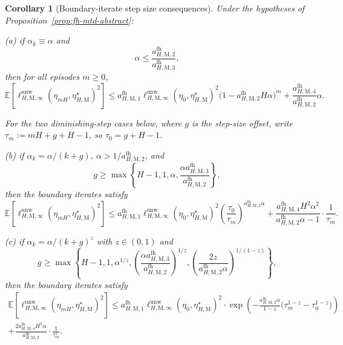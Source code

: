 \documentclass{article}
\newtheorem{corollary}[theorem]{Corollary}
\begin{document}
\begin{corollary}[Boundary-iterate step size consequences]
\label{cor:fh-mtd-steps}
Under the hypotheses of Proposition~\ref{prop:fh-mtd-abstract}:

\textup{(a)} if $\alpha_k \equiv \alpha$ and
\begin{equation}
\alpha \le \frac{a_{H,\mathrm M,2}^{\mathrm{fh}}}{a_{H,\mathrm M,3}^{\mathrm{fh}}},
\end{equation}
then for all episodes $m \ge 0$,
\begin{equation}
\mathbb E\left[ \ell_{H,\mathrm M,\infty}^{\mathrm{unw}}(\eta_{mH},\eta_{H,\mathrm M}^\star)^2 \right] \le a_{H,\mathrm M,1}^{\mathrm{fh}} \ell_{H,\mathrm M,\infty}^{\mathrm{unw}}(\eta_0,\eta_{H,\mathrm M}^\star)^2 \bigl(1-a_{H,\mathrm M,2}^{\mathrm{fh}}H\alpha\bigr)^m + \frac{a_{H,\mathrm M,4}^{\mathrm{fh}}}{a_{H,\mathrm M,2}^{\mathrm{fh}}}\alpha.
\end{equation}

For the two diminishing-step cases below, where $g$ is the step-size offset, write $\tau_m:=mH+g+H-1$, so $\tau_0=g+H-1$.

\textup{(b)} if $\alpha_k = \alpha/(k+g)$, $\alpha > 1/a_{H,\mathrm M,2}^{\mathrm{fh}}$, and
\begin{equation}
g \ge \max\left\{H-1,1,\alpha,\frac{\alpha a_{H,\mathrm M,3}^{\mathrm{fh}}}{a_{H,\mathrm M,2}^{\mathrm{fh}}}\right\},
\end{equation}
then the boundary iterates satisfy
\begin{equation}
\mathbb E\left[ \ell_{H,\mathrm M,\infty}^{\mathrm{unw}}(\eta_{mH},\eta_{H,\mathrm M}^\star)^2 \right] \le a_{H,\mathrm M,1}^{\mathrm{fh}}\ell_{H,\mathrm M,\infty}^{\mathrm{unw}}(\eta_0,\eta_{H,\mathrm M}^\star)^2 \left(\frac{\tau_0}{\tau_m}\right)^{a_{H,\mathrm M,2}^{\mathrm{fh}}\alpha}+\frac{a_{H,\mathrm M,4}^{\mathrm{fh}}H^2\alpha^2}{a_{H,\mathrm M,2}^{\mathrm{fh}}\alpha-1}\cdot\frac{1}{\tau_m}.
\end{equation}

\textup{(c)} if $\alpha_k = \alpha/(k+g)^z$ with $z \in (0,1)$ and
\begin{equation}
g \ge \max\left\{H-1,1,\alpha^{1/z}, \left(\frac{\alpha a_{H,\mathrm M,3}^{\mathrm{fh}}}{a_{H,\mathrm M,2}^{\mathrm{fh}}}\right)^{1/z}, \left(\frac{2z}{a_{H,\mathrm M,2}^{\mathrm{fh}}\alpha}\right)^{1/(1-z)} \right\},
\end{equation}
then the boundary iterates satisfy
\begin{equation}
\begin{gathered}
\mathbb E\left[ \ell_{H,\mathrm M,\infty}^{\mathrm{unw}}(\eta_{mH},\eta_{H,\mathrm M}^\star)^2 \right] \le a_{H,\mathrm M,1}^{\mathrm{fh}}\ell_{H,\mathrm M,\infty}^{\mathrm{unw}}(\eta_0,\eta_{H,\mathrm M}^\star)^2\cdot\exp\left(-\frac{a_{H,\mathrm M,2}^{\mathrm{fh}}\alpha}{1-z}\bigl(\tau_m^{1-z}-\tau_0^{1-z}\bigr)\right)\\+\frac{2a_{H,\mathrm M,4}^{\mathrm{fh}}H^2\alpha}{a_{H,\mathrm M,2}^{\mathrm{fh}}}\cdot\frac{1}{\tau_m^z}.
\end{gathered}
\end{equation}
\end{corollary}
\end{document}
